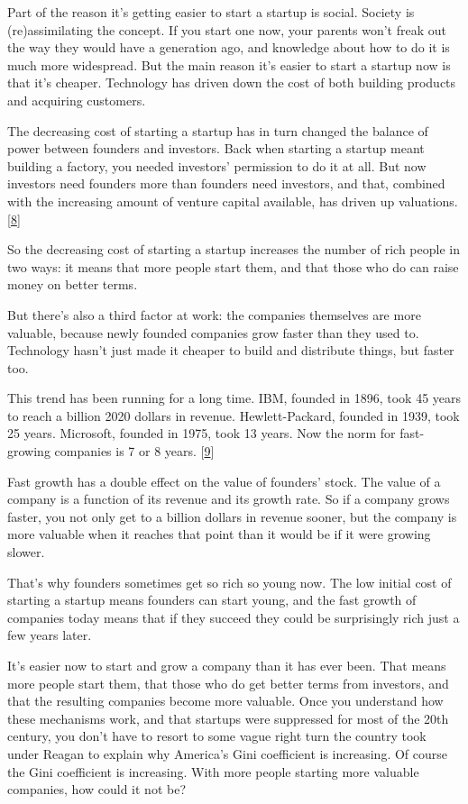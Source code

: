 Part of the reason it's getting easier to start a startup is social.
Society is (re)assimilating the concept. If you start one now, your
parents won't freak out the way they would have a generation ago, and
knowledge about how to do it is much more widespread. But the main
reason it's easier to start a startup now is that it's cheaper.
Technology has driven down the cost of both building products and
acquiring customers.

The decreasing cost of starting a startup has in turn changed the
balance of power between founders and investors. Back when starting a
startup meant building a factory, you needed investors' permission to do
it at all. But now investors need founders more than founders need
investors, and that, combined with the increasing amount of venture
capital available, has driven up valuations. {[}\hyperref[f8n]{8}{]}

So the decreasing cost of starting a startup increases the number of
rich people in two ways: it means that more people start them, and that
those who do can raise money on better terms.

But there's also a third factor at work: the companies themselves are
more valuable, because newly founded companies grow faster than they
used to. Technology hasn't just made it cheaper to build and distribute
things, but faster too.

This trend has been running for a long time. IBM, founded in 1896, took
45 years to reach a billion 2020 dollars in revenue. Hewlett-Packard,
founded in 1939, took 25 years. Microsoft, founded in 1975, took 13
years. Now the norm for fast-growing companies is 7 or 8 years.
{[}\hyperref[f9n]{9}{]}

Fast growth has a double effect on the value of founders' stock. The
value of a company is a function of its revenue and its growth rate. So
if a company grows faster, you not only get to a billion dollars in
revenue sooner, but the company is more valuable when it reaches that
point than it would be if it were growing slower.

That's why founders sometimes get so rich so young now. The low initial
cost of starting a startup means founders can start young, and the fast
growth of companies today means that if they succeed they could be
surprisingly rich just a few years later.

It's easier now to start and grow a company than it has ever been. That
means more people start them, that those who do get better terms from
investors, and that the resulting companies become more valuable. Once
you understand how these mechanisms work, and that startups were
suppressed for most of the 20th century, you don't have to resort to
some vague right turn the country took under Reagan to explain why
America's Gini coefficient is increasing. Of course the Gini coefficient
is increasing. With more people starting more valuable companies, how
could it not be?


